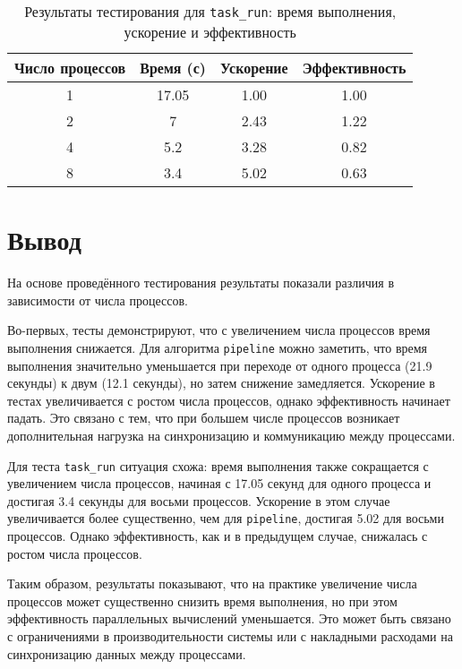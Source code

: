 \documentclass[a4paper,14pt]{extarticle}
\begin{document}
\begin{table}[t] %
\centering
\setlength{\tabcolsep}{3pt} %
\small
\begin{tabular}{|c|c|c|c|}  
\hline
\textbf{Число процессов} & \textbf{Время (с)} & \textbf{Ускорение} & \textbf{Эффективность } \\ \hline
1 & 17.05 & 1.00 & 1.00 \\ \hline
2 & 7 & 2.43 & 1.22 \\ \hline
4 & 5.2 & 3.28 & 0.82 \\ \hline
8 & 3.4 & 5.02 & 0.63 \\ \hline
\end{tabular}
\caption{Результаты тестирования для \texttt{task\_run}: время выполнения, ускорение и эффективность}
\end{table}

\clearpage

\section*{Вывод}

На основе проведённого тестирования результаты показали различия в зависимости от числа процессов.

Во-первых, тесты демонстрируют, что с увеличением числа процессов время выполнения снижается. Для алгоритма \texttt{pipeline} можно заметить, что время выполнения значительно уменьшается при переходе от одного процесса (21.9 секунды) к двум (12.1 секунды), но затем снижение замедляется.  Ускорение в тестах увеличивается с ростом числа процессов, однако эффективность начинает падать. Это связано с тем, что при большем числе процессов возникает дополнительная нагрузка на синхронизацию и коммуникацию между процессами.

Для теста \texttt{task\_run} ситуация схожа: время выполнения также сокращается с увеличением числа процессов, начиная с 17.05 секунд для одного процесса и достигая 3.4 секунды для восьми процессов. Ускорение в этом случае увеличивается более существенно, чем для \texttt{pipeline}, достигая 5.02 для восьми процессов. Однако эффективность, как и в предыдущем случае, снижалась с ростом числа процессов.

Таким образом, результаты показывают, что на практике увеличение числа процессов может существенно снизить время выполнения, но при этом эффективность параллельных вычислений уменьшается. Это может быть связано с ограничениями в производительности системы или с накладными расходами на синхронизацию данных между процессами. 
\end{document}
